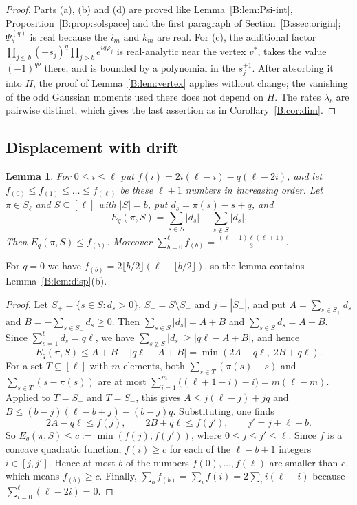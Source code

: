 \documentclass[11pt,a4paper]{article}
\newtheorem{lemma}[theorem]{Lemma}
\theoremstyle{definition}
\theoremstyle{remark}
\newcommand{\fl}[1]{\lfloor #1\rfloor}
\numberwithin{equation}{section}
\begin{document}
\begin{proof}
Parts (a), (b) and (d) are proved like Lemma~\ref{B:lem:Psi-int}, Proposition~\ref{B:prop:solspace} and the first paragraph of Section~\ref{B:ssec:origin}; $\Psi^{(q)}_b$ is real because the $i_m$ and $k_m$ are real. For (c), the additional factor $\prod_{j\le b}(-s_j)^q\prod_{j>b}e^{iq\varphi_j}$ is real-analytic near the vertex $v^*$, takes the value $(-1)^{qb}$ there, and is bounded by a polynomial in the $s_j^{\pm1}$. After absorbing it into $H$, the proof of Lemma~\ref{B:lem:vertex} applies without change; the vanishing of the odd Gaussian moments used there does not depend on $H$. The rates $\lambda_b$ are pairwise distinct, which gives the last assertion as in Corollary~\ref{B:cor:dim}.
\end{proof}

\subsection{Displacement with drift}

\begin{lemma}\label{B:lem:disp-q}
For $0\le i\le\ell$ put $f(i)=2i(\ell-i)-q(\ell-2i)$, and let $f_{(0)}\le f_{(1)}\le\dots\le f_{(\ell)}$ be these $\ell+1$ numbers in increasing order. Let $\pi\in S_\ell$ and $S\subseteq[\ell]$ with $|S|=b$, put $d_s=\pi(s)-s+q$, and
\[
E_q(\pi,S)=\sum_{s\in S}|d_s|-\sum_{s\notin S}|d_s| .
\]
Then $E_q(\pi,S)\le f_{(b)}$. Moreover $\sum_{b=0}^{\ell}f_{(b)}=\frac{(\ell-1)\ell(\ell+1)}3$.
\end{lemma}

For $q=0$ we have $f_{(b)}=2\fl{b/2}(\ell-\fl{b/2})$, so the lemma contains Lemma~\ref{B:lem:disp}(b).

\begin{proof}
Let $S_+=\{s\in S:d_s>0\}$, $S_-=S\setminus S_+$ and $j=|S_+|$, and put $A=\sum_{s\in S_+}d_s$ and $B=-\sum_{s\in S_-}d_s\ge0$. Then $\sum_{s\in S}|d_s|=A+B$ and $\sum_{s\in S}d_s=A-B$. Since $\sum_{s=1}^{\ell}d_s=q\ell$, we have $\sum_{s\notin S}|d_s|\ge|q\ell-A+B|$, and hence
\[
E_q(\pi,S)\le A+B-|q\ell-A+B|=\min(2A-q\ell,\;2B+q\ell).
\]
For a set $T\subseteq[\ell]$ with $m$ elements, both $\sum_{s\in T}(\pi(s)-s)$ and $\sum_{s\in T}(s-\pi(s))$ are at most $\sum_{i=1}^m\bigl((\ell+1-i)-i\bigr)=m(\ell-m)$. Applied to $T=S_+$ and $T=S_-$, this gives $A\le j(\ell-j)+jq$ and $B\le(b-j)(\ell-b+j)-(b-j)q$. Substituting, one finds
\[
2A-q\ell\le f(j),\qquad 2B+q\ell\le f(j'),\qquad j'=j+\ell-b .
\]
So $E_q(\pi,S)\le c:=\min(f(j),f(j'))$, where $0\le j\le j'\le\ell$. Since $f$ is a concave quadratic function, $f(i)\ge c$ for each of the $\ell-b+1$ integers $i\in[j,j']$. Hence at most $b$ of the numbers $f(0),\dots,f(\ell)$ are smaller than $c$, which means $f_{(b)}\ge c$. Finally, $\sum_bf_{(b)}=\sum_if(i)=2\sum_ii(\ell-i)$ because $\sum_{i=0}^{\ell}(\ell-2i)=0$.
\end{proof}
\end{document}
